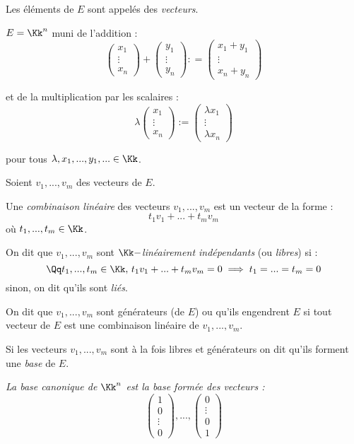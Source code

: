 \documentclass[class=report,crop=false]{standalone}
\begin{document}
Les éléments de $E$ sont appelés des {\it vecteurs}.

\begin{exemple}[de base]
$E = \Kk^n$ muni de l'addition :
\[\left(\begin{array}{c}
x_1 \\
\vdots \\
x_n
\end{array}\right) + \left(\begin{array}{c}
y_1 \\
\vdots \\
y_n
\end{array}\right) : = \left(\begin{array}{c}
x_1 +y_1\\
\vdots \\
x_n +y_n
\end{array}\right)\]

et de la multiplication par les scalaires :
\[\lambda \left(\begin{array}{c}
x_1 \\
\vdots \\
x_n
\end{array}\right) := \left(\begin{array}{c}
\lambda x_1 \\
\vdots \\
\lambda x_n
\end{array}\right)\]

pour tous $\lambda,x_1,...,y_1,... \in \Kk$.
\end{exemple}


Soient $v_1,...,v_m$ des vecteurs de $E$.

Une {\it combinaison linéaire} des vecteurs $v_1,...,v_m$ est un vecteur de la forme :
\[t_1v_1+...+t_mv_m\]
où $t_1,...,t_m \in \Kk$.

On dit que $v_1,...,v_m$ sont {\it $\Kk-$linéairement indépendants} (ou {\it libres}) si :
\[\Qq t_1,...,t_m \in \Kk, \, t_1v_1+...+t_mv_m = 0 \implies t_1 = ...= t_m=0 \]
 sinon, on dit qu'ils sont {\it liés}.

On dit que $v_1,...,v_m$ sont générateurs (de $E$) ou qu'ils engendrent $E$ si tout vecteur de $E$ est une combinaison linéaire de $v_1,...,v_m$.

Si les vecteurs $v_1,...,v_m$ sont à la fois libres et générateurs on dit qu'ils forment une {\it base} de $E$.

\begin{exemple}
{\it La base canonique de $\Kk^n$ est la base formée des vecteurs :
\[\left(\begin{array}{c}
1 \\
0\\
\vdots\\
0
\end{array}\right), ..., \left(\begin{array}{c}
0 \\
\vdots\\
0\\
1
\end{array}\right)\]
}
\end{exemple}
\end{document}
